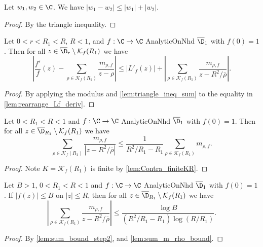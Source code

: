 \begin{lemma}\label{lem:triangle_ineq_sum} 
\leanok
Let $w_1, w_2 \in \C$. We have $|w_1 - w_2| \le |w_1| + |w_2|$.
\end{lemma}
\begin{proof}
\leanok
By the triangle inequality.
\end{proof}

\begin{lemma}\label{lem:target_inequality_setup} 
\leanok
Let $0<r<R_1<R$, $R < 1$, and $f:\C\to\C$ AnalyticOnNhd $\overline{\D}_1$ with $f(0)=1$. Then for all $z\in \overline{\D}_{r}\setminus\mathcal K_f(R_1)$ we have
\[\left|\frac{f'}{f}(z) - \sum_{\rho\in\mathcal K_f(R_1)}\frac{m_{\rho,f}}{z-\rho}\right| \le |L'_f(z)| + \left|\sum_{\rho\in\mathcal K_f(R_1)}\frac{m_{\rho,f}}{z-R^2/\bar\rho}\right|.\]
\end{lemma}
\begin{proof}
\leanok
{}
By applying the modulus and \cref{lem:triangle_ineq_sum} to the equality in \cref{lem:rearrange_Lf_deriv}.
\end{proof}


\begin{lemma}\label{lem:sum_bound_step2} 
\leanok
Let $0<R_1<R<1$ and $f:\C\to\C$ AnalyticOnNhd $\overline{\D}_1$ with $f(0)=1$. Then for all $z\in \overline{\D}_{R_1}\setminus\mathcal K_f(R_1)$ we have
\[\sum_{\rho\in\mathcal K_f(R_1)}\frac{m_{\rho,f}}{|z-R^2/\bar\rho|} \le \frac{1}{R^2/R_1 - R_1}\sum_{\rho\in\mathcal K_f(R_1)}m_{\rho,f}.\]
\end{lemma}
\begin{proof}
\leanok
{}
Note $K=\mathcal K_f(R_1)$ is finite by \cref{lem:Contra_finiteKR}.
\end{proof}

\begin{lemma}\label{lem:final_sum_bound} 
\leanok
Let $B>1$, $0<R_1< R<1$ and $f:\C\to\C$ AnalyticOnNhd $\overline{\D}_1$ with $f(0)=1$. If $|f(z)|\le B$ on $|z|\le R$, then for all $z\in \overline{\D}_{R_1}\setminus\mathcal K_f(R_1)$ we have
\[\left|\sum_{\rho\in\mathcal K_f(R_1)}\frac{m_{\rho,f}}{z-R^2/\bar\rho}\right| \le \frac{\log B}{(R^2/R_1 - R_1) \log(R/R_1)}.\]
\end{lemma}
\begin{proof}
\leanok
By \cref{lem:sum_bound_step2}, and \cref{lem:sum_m_rho_bound}.
\end{proof}

